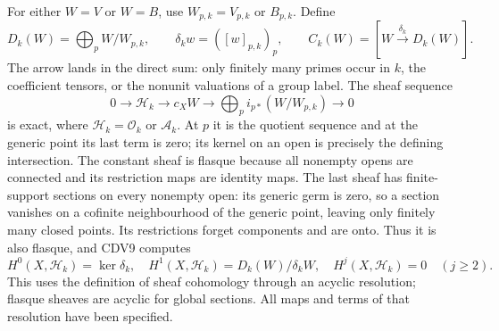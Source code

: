 For either $W=V$ or $W=B$, use $W_{p,k}=V_{p,k}$ or $B_{p,k}$.
Define
\begin{equation}\tag{CDV8}
 D_k(W)=\bigoplus_pW/W_{p,k},\qquad
 \delta_k w=([w]_{p,k})_p,\qquad
 C_k(W)=[W\xrightarrow{\delta_k}D_k(W)].
\end{equation}
The arrow lands in the direct sum: only finitely many primes occur
in $k$, the coefficient tensors, or the nonunit valuations of a group
label. The sheaf sequence
\begin{equation}\tag{CDV9}
 0\longrightarrow\mathcal H_k\longrightarrow c_XW
 \longrightarrow\bigoplus_p i_{p*}(W/W_{p,k})\longrightarrow0
\end{equation}
is exact, where $\mathcal H_k=\mathcal O_k$ or $\mathcal A_k$.
At $p$ it is the quotient sequence and at the generic point its last
term is zero; its kernel on an open is precisely the defining
intersection. The constant sheaf is flasque because all nonempty
opens are connected and its restriction maps are identity maps. The
last sheaf has finite-support sections on every nonempty open:
its generic germ is zero, so a section vanishes on a cofinite
neighbourhood of the generic point, leaving only finitely many closed
points. Its restrictions forget components and are onto. Thus it is
also flasque, and CDV9 computes
\begin{equation}\tag{CDV10}
 H^0(X,\mathcal H_k)=\ker\delta_k,\quad
 H^1(X,\mathcal H_k)=D_k(W)/\delta_kW,\quad
 H^j(X,\mathcal H_k)=0\quad(j\ge2).
\end{equation}
This uses the definition of sheaf cohomology through an acyclic
resolution; flasque sheaves are acyclic for global sections. All
maps and terms of that resolution have been specified.

